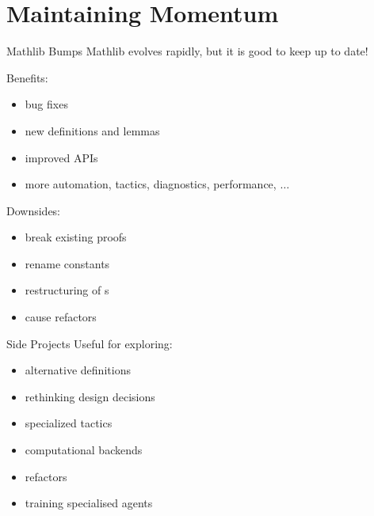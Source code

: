 \documentclass{beamer}
\newcommand{\cverb}[1]{{\color{purple}{\texttt{#1}}}}
\begin{document}
\section{Maintaining Momentum}

\begin{frame}{Mathlib Bumps}
Mathlib evolves rapidly, but it is good to keep up to date!

\bigskip

Benefits:

\smallskip

\begin{itemize}
  \item bug fixes
  \smallskip
  \item new definitions and lemmas
  \smallskip
  \item improved APIs
  \smallskip
  \item more automation, tactics, diagnostics, performance, $\ldots$
\end{itemize}

\bigskip

Downsides:

\smallskip

\begin{itemize}
  \item break existing proofs
  \smallskip
  \item rename constants
  \smallskip
  \item restructuring of \cverb{import}s
  \smallskip
  \item cause refactors
\end{itemize}
\end{frame}

\begin{frame}{Side Projects}
Useful for exploring:

\medskip

\begin{itemize}
  \item alternative definitions
  \smallskip
  \item rethinking design decisions
  \smallskip
  \item specialized tactics
  \smallskip
  \item computational backends
  \smallskip
  \item refactors
  \smallskip
  \item training specialised agents
\end{itemize}
\end{frame}
\end{document}
